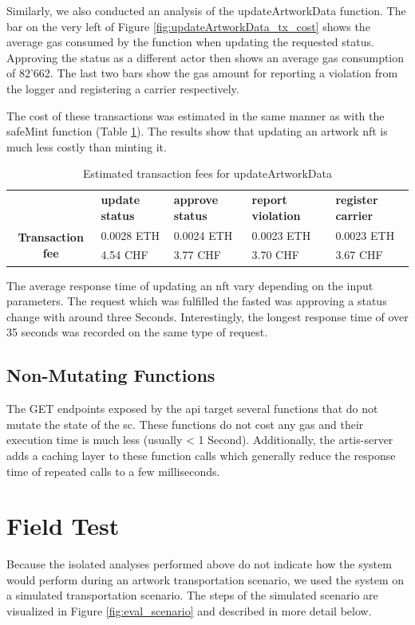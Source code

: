 Similarly, we also conducted an analysis of the updateArtworkData function. The bar on the very left of Figure \ref{fig:updateArtworkData_tx_cost} shows the average gas consumed by the function when updating the requested status. Approving the status as a different actor then shows an average gas consumption of 82'662. The last two bars show the gas amount for reporting a violation from the logger and registering a carrier respectively.

The cost of these transactions was estimated in the same manner as with the safeMint function (Table \ref{tab:updateArtworkData_tx_fees}). The results show that updating an artwork \gls{nft} is much less costly than minting it. 

\begin{table}[ht]
\begin{tabular}{cllll}
                                          & \textbf{update status} & \textbf{approve status} & \textbf{report violation} & \textbf{register carrier} \\ \cline{2-5} 
\multirow{2}{*}{\textbf{Transaction fee}} & 0.0028 ETH             & 0.0024 ETH          & 0.0023 ETH        & 0.0023 ETH       \\
                                          & 4.54 CHF               & 3.77 CHF            & 3.70 CHF          & 3.67 CHF       
\end{tabular}
\caption{Estimated transaction fees for updateArtworkData}
\label{tab:updateArtworkData_tx_fees}
\end{table}

The average response time of updating an \gls{nft} vary depending on the input parameters. The request which was fulfilled the fasted was approving a status change with around three Seconds. Interestingly, the longest response time of over 35 seconds was recorded on the same type of request.


\subsection*{Non-Mutating Functions}
The GET endpoints exposed by the \gls{api} target several functions that do not mutate the state of the \gls{sc}. These functions do not cost any gas and their execution time is much less (usually < 1 Second). Additionally, the artis-server adds a caching layer to these function calls which generally reduce the response time of repeated calls to a few milliseconds. 

\section{Field Test}
\label{sec:field_test}
Because the isolated analyses performed above do not indicate how the system would perform during an artwork transportation scenario, we used the system on a simulated transportation scenario. The steps of the simulated scenario are visualized in Figure \ref{fig:eval_scenario} and described in more detail below.

